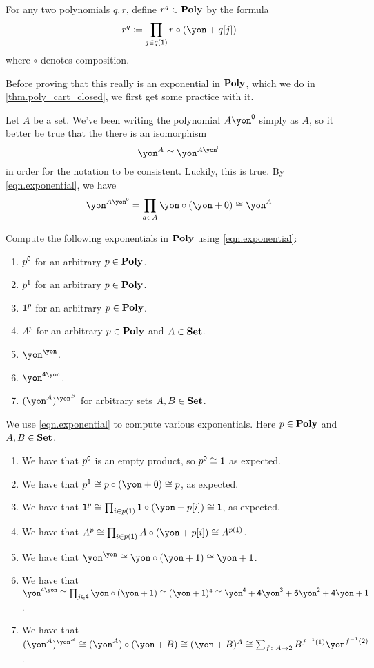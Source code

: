 \documentclass[Book-Poly]{subfiles}
\begin{document}
For any two polynomials $q,r$, define $r^q\in\mathbf{Poly}$ by the formula
\begin{equation}\label{eqn.exponential}
  r^q\coloneqq\prod_{j\in q(\1)}r\circ(\yon+q[j])
\end{equation}
where $\circ$ denotes composition.

Before proving that this really is an exponential in $\mathbf{Poly}$, which we do in \cref{thm.poly_cart_closed}, we first get some practice with it.

\begin{example}
Let $A$ be a set. We've been writing the polynomial $A\yon^\0$ simply as $A$, so it better be true that the there is an isomorphism 
\[
    \yon^A \iso \yon^{A\yon^\0}
\]
in order for the notation to be consistent. 
Luckily, this is true.
By \eqref{eqn.exponential}, we have
\[
    \yon^{A\yon^\0} = \prod_{a\in A} \yon \circ (\yon+\0) \iso \yon^A
\]
\end{example}

\begin{exercise}
Compute the following exponentials in $\mathbf{Poly}$ using \eqref{eqn.exponential}:
\begin{enumerate}
	\item $p^{\textsf{0}}$ for an arbitrary $p\in\mathbf{Poly}$.
	\item $p^{\textsf{1}}$ for an arbitrary $p\in\mathbf{Poly}$.
	\item $\textsf{1}^p$ for an arbitrary $p\in\mathbf{Poly}$.
	\item $A^p$ for an arbitrary $p\in\mathbf{Poly}$ and $A\in\mathbf{Set}$.
	\item $\yon^\yon$.
	\item $\yon^{\4\yon}$.
	\item $(\yon^A)^{\yon^B}$ for arbitrary sets $A,B\in\mathbf{Set}$.
\qedhere
\end{enumerate}
\begin{solution}
We use \eqref{eqn.exponential} to compute various exponentials.
Here $p \in \mathbf{Poly}$ and $A, B \in \mathbf{Set}$.
\begin{enumerate}
    \item We have that $p^{\textsf{0}}$ is an empty product, so $p^{\textsf{0}} \cong \textsf{1}$ as expected.
	\item We have that $p^\1 \iso p \circ (\yon + \0) \iso p$, as expected.
	\item We have that $\1^p \iso \prod_{i \in p(\1)} \1 \circ (\yon + p[i]) \iso \1$, as expected.
	\item We have that $A^p \iso \prod_{i \in p(\1)} A \circ (\yon + p[i]) \iso A^{p(\1)}$.
	\item We have that $\yon^\yon \iso \yon \circ (\yon + \1) \iso \yon + \1$.
	\item We have that $\yon^{\4\yon} \iso \prod_{j \in \4} \yon \circ (\yon + \1) \iso (\yon + \1)^\4 \iso \yon^\4 + \4\yon^\3 + \6\yon^\2 + \4\yon + \1$.
	\item We have that $(\yon^A)^{\yon^B} \iso (\yon^A) \circ (\yon + B) \iso (\yon + B)^A \iso \sum_{f \colon A \to \2} B^{f\inv(1)} \yon^{f\inv(2)}$.
\end{enumerate}
\end{solution}
\end{exercise}
\end{document}
